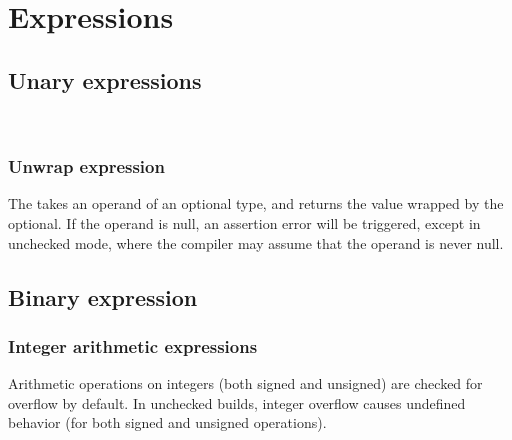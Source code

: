 
\chapter{Expressions}

\section{Unary expressions}

\begin{grammar}
 \textrightarrow{}  \\
 \textrightarrow{}  
\end{grammar}

\subsection{Unwrap expression}

\begin{grammar}
 \textrightarrow{}  \code{!}
\end{grammar}

The  takes an operand of an optional type, and
returns the value wrapped by the optional. If the operand is null, an assertion
error will be triggered, except in unchecked mode, where the compiler may assume
that the operand is never null.

\section{Binary expression}

\begin{grammar}
 \textrightarrow{}   
\end{grammar}

\subsection{Integer arithmetic expressions}

Arithmetic operations on integers (both signed and unsigned) are checked for
overflow by default. In unchecked builds, integer overflow causes undefined
behavior (for both signed and unsigned operations).

